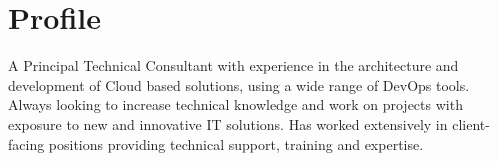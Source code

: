 \section{Profile}

A Principal Technical Consultant with experience in the architecture 
and development of Cloud based solutions, using a wide 
range of DevOps tools. Always looking to increase technical 
knowledge and work on projects with exposure to new and innovative 
IT solutions. Has worked extensively in client-facing positions 
providing technical support, training and expertise.

\closesection{}
